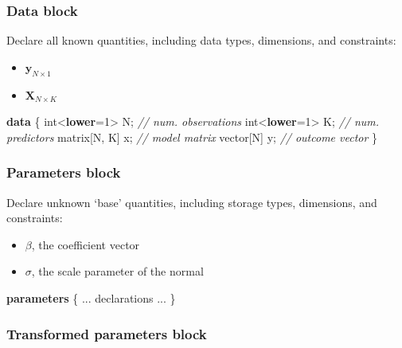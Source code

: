 \documentclass[
  11pt,
]{article}
\newenvironment{Shaded}{\begin{snugshade}}{\end{snugshade}}
\newcommand{\CommentTok}[1]{\textcolor[rgb]{0.56,0.35,0.01}{\textit{#1}}}
\newcommand{\DataTypeTok}[1]{\textcolor[rgb]{0.13,0.29,0.53}{#1}}
\newcommand{\DecValTok}[1]{\textcolor[rgb]{0.00,0.00,0.81}{#1}}
\newcommand{\KeywordTok}[1]{\textcolor[rgb]{0.13,0.29,0.53}{\textbf{#1}}}
\newcommand{\NormalTok}[1]{#1}
\providecommand{\tightlist}{%
  \setlength{\itemsep}{0pt}\setlength{\parskip}{0pt}}
\begin{document}
\hypertarget{data-block}{%
\subsubsection{Data block}\label{data-block}}

Declare all known quantities, including data types, dimensions, and constraints:

\begin{itemize}
\tightlist
\item
  \(\mathbf{y}_{N \times 1}\)
\item
  \(\mathbf{X}_{N \times K}\)
\end{itemize}

\begin{Shaded}
\begin{Highlighting}[]
\KeywordTok{data}\NormalTok{ \{}
  \DataTypeTok{int}\NormalTok{\textless{}}\KeywordTok{lower}\NormalTok{=}\DecValTok{1}\NormalTok{\textgreater{} N; }\CommentTok{// num. observations}
  \DataTypeTok{int}\NormalTok{\textless{}}\KeywordTok{lower}\NormalTok{=}\DecValTok{1}\NormalTok{\textgreater{} K; }\CommentTok{// num. predictors}
  \DataTypeTok{matrix}\NormalTok{[N, K] x; }\CommentTok{// model matrix}
  \DataTypeTok{vector}\NormalTok{[N] y;    }\CommentTok{// outcome vector}
\NormalTok{\}}
\end{Highlighting}
\end{Shaded}

\hypertarget{parameters-block}{%
\subsubsection{Parameters block}\label{parameters-block}}

Declare unknown `base' quantities, including storage types, dimensions, and constraints:

\begin{itemize}
\tightlist
\item
  \(\beta\), the coefficient vector
\item
  \(\sigma\), the scale parameter of the normal
\end{itemize}

\begin{Shaded}
\begin{Highlighting}[]
\KeywordTok{parameters}\NormalTok{ \{}
\NormalTok{  ... declarations ...}
\NormalTok{\}}
\end{Highlighting}
\end{Shaded}

\hypertarget{transformed-parameters-block}{%
\subsubsection{Transformed parameters block}\label{transformed-parameters-block}}
\end{document}
